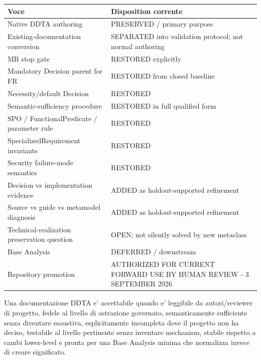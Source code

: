 \documentclass[11pt,a4paper]{article}
\begin{document}
{\small
\begin{tabularx}{\textwidth}{L{58mm}Y}
\toprule
\textbf{Voce} & \textbf{Disposition corrente} \\
\midrule
Native DDTA authoring & PRESERVED / primary purpose \\
Existing-documentation conversion & SEPARATED into validation protocol; not normal authoring \\
MR stop gate & RESTORED explicitly \\
Mandatory Decision parent for FR & RESTORED from closed baseline \\
Necessity/default Decision & RESTORED \\
Semantic-sufficiency procedure & RESTORED in full qualified form \\
SPO / FunctionalPredicate / parameter rule & RESTORED \\
SpecializedRequirement invariants & RESTORED \\
Security failure-mode semantics & RESTORED \\
Decision vs implementation evidence & ADDED as holdout-supported refinement \\
Source vs guide vs metamodel diagnosis & ADDED as holdout-supported refinement \\
Technical-realization preservation question & OPEN; not silently solved by new metaclass \\
Base Analysis & DEFERRED / downstream \\
Repository promotion & AUTHORIZED FOR CURRENT FORWARD USE BY HUMAN REVIEW - 3 SEPTEMBER 2026 \\
\bottomrule
\end{tabularx}
}

\begin{ddtaprinciple}[title={Final acceptance rule}]
Una documentazione DDTA e' accettabile quando e' leggibile da autori/reviewer di progetto, fedele al livello di astrazione governato, semanticamente sufficiente senza diventare esaustiva, esplicitamente incompleta dove il progetto non ha deciso, testabile al livello pertinente senza inventare mechanism, stabile rispetto a cambi lower-level e pronta per una Base Analysis minima che normalizza invece di creare significato.
\end{ddtaprinciple}
\end{document}
